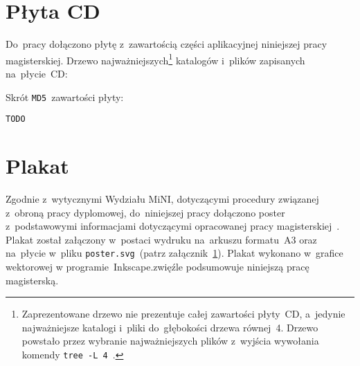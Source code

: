 \documentclass[thesis]{subfiles}
\begin{document}

\begin{appendices}

\chapter{Płyta CD}
\label{cd-appendix}

Do~pracy dołączono płytę z~zawartością części aplikacyjnej niniejszej pracy magisterskiej. Drzewo najważniejszych\footnote{Zaprezentowane drzewo nie prezentuje całej zawartości płyty~CD, a~jedynie najważniejsze katalogi i~pliki do~głębokości drzewa równej~4. Drzewo powstało przez wybranie najważniejszych plików z~wyjścia wywołania komendy \mbox{\texttt{tree~-L~4}}~\cite{tree-manual}.} katalogów i~plików zapisanych na~płycie~CD: %

\noindent Skrót \texttt{MD5}~zawartości płyty:
\begin{center}
\texttt{TODO}
\end{center}

\chapter{Plakat}
Zgodnie z~wytycznymi Wydziału MiNI, dotyczącymi procedury związanej z~obroną pracy dyplomowej, do~niniejszej pracy dołączono poster z~podstawowymi informacjami dotyczącymi opracowanej pracy magisterskiej~\cite{informacje-dot-obron}. Plakat został załączony w~postaci wydruku na~arkuszu formatu~A3 oraz na~płycie w~pliku \mbox{\texttt{poster.svg}}~(patrz załącznik~\ref{cd-appendix}). Plakat wykonano w~grafice wektorowej w programie~Inkscape.zwięźle podsumowuje niniejszą pracę magisterską.

\end{appendices}
\end{document}
